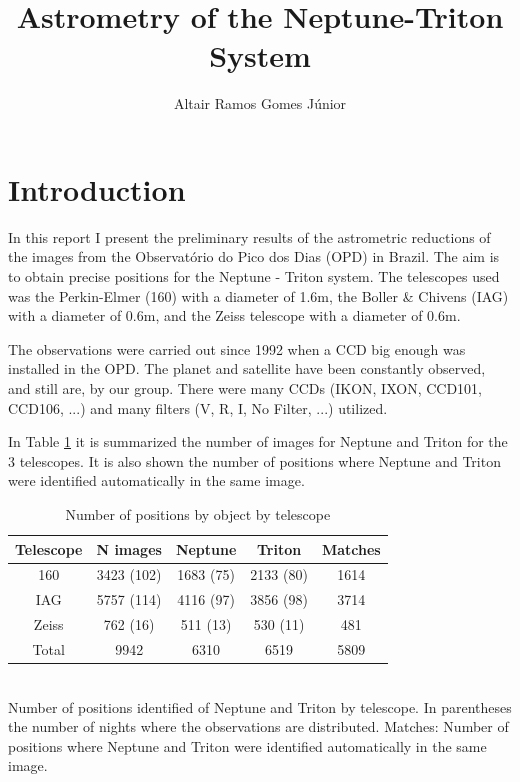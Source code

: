\documentclass[12pt,a4paper]{report}
\author{Altair Ramos Gomes Júnior}
\title{Astrometry of the Neptune-Triton System}
\newcommand{\PE}{Perkin-Elmer }
\newcommand{\BC}{Boller \& Chivens }
\begin{document}
\maketitle

\pagestyle{headings}

\section*{Introduction}

In this report I present the preliminary results of the astrometric reductions of the images from the Observatório do Pico dos Dias (OPD) in Brazil. The aim is to obtain precise positions for the Neptune - Triton system. The telescopes used was the \PE (160) with a diameter of 1.6m, the \BC (IAG) with a diameter of 0.6m, and the Zeiss telescope with a diameter of 0.6m.

The observations were carried out since 1992 when a CCD big enough was installed in the OPD. The planet and satellite have been constantly observed, and still are, by our group. There were many CCDs (IKON, IXON, CCD101, CCD106, ...) and many filters (V, R, I, No Filter, ...) utilized.


In Table \ref{Tab:dados} it is summarized the number of images for Neptune and Triton for the 3 telescopes. It is also shown the number of positions where Neptune and Triton were identified automatically in the same image.

\begin{table}[h]
\centering
\caption{Number of positions by object by telescope}
\label{Tab:dados}
\begin{tabular}{|c|c|c|c|c|}
\hline 
Telescope & N images & Neptune & Triton & Matches \\ 
\hline
160 & 3423 (102) & 1683 (75) & 2133 (80) & 1614 \\ 
\hline 
IAG & 5757 (114) & 4116 (97) & 3856 (98) & 3714 \\ 
\hline 
Zeiss & 762 (16) & 511 (13) & 530 (11) & 481 \\ 
\hline 
Total & 9942 & 6310 & 6519 & 5809 \\ 
\hline 
\end{tabular}
\\Number of positions identified of Neptune and Triton by telescope. In parentheses the number of nights where the observations are distributed. Matches: Number of positions where Neptune and Triton were identified automatically in the same image.
\end{table}
\end{document}
